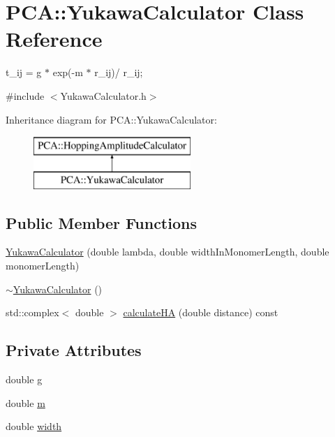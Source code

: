 \hypertarget{class_p_c_a_1_1_yukawa_calculator}{}\section{P\+CA\+:\+:Yukawa\+Calculator Class Reference}
\label{class_p_c_a_1_1_yukawa_calculator}


t\+\_\+ij = g $\ast$ exp(-\/m $\ast$ r\+\_\+ij)/ r\+\_\+ij;  




{\ttfamily \#include $<$Yukawa\+Calculator.\+h$>$}

Inheritance diagram for P\+CA\+:\+:Yukawa\+Calculator\+:\begin{figure}[H]
\begin{center}
\leavevmode
\includegraphics[height=2.000000cm]{class_p_c_a_1_1_yukawa_calculator}
\end{center}
\end{figure}
\subsection*{Public Member Functions}
\begin{DoxyCompactItemize}
\item 
\hyperlink{class_p_c_a_1_1_yukawa_calculator_a8e905580206166f9b63fa24171d48346}{Yukawa\+Calculator} (double lambda, double width\+In\+Monomer\+Length, double monomer\+Length)
\item 
\hyperlink{class_p_c_a_1_1_yukawa_calculator_ab9dcb06991228cb9a48f773ee3375603}{$\sim$\+Yukawa\+Calculator} ()
\item 
std\+::complex$<$ double $>$ \hyperlink{class_p_c_a_1_1_yukawa_calculator_a543f237d55350a7669f8b85789cae68d}{calculate\+HA} (double distance) const
\end{DoxyCompactItemize}
\subsection*{Private Attributes}
\begin{DoxyCompactItemize}
\item 
double \hyperlink{class_p_c_a_1_1_yukawa_calculator_a9fc1cfaf2c30fdd14561238a5b114a0c}{g}
\item 
double \hyperlink{class_p_c_a_1_1_yukawa_calculator_a4b442aa74b079ce8778e19d69c163cf6}{m}
\item 
double \hyperlink{class_p_c_a_1_1_yukawa_calculator_a69e1097584c632e6e43320ef6fc384dc}{width}
\end{DoxyCompactItemize}


